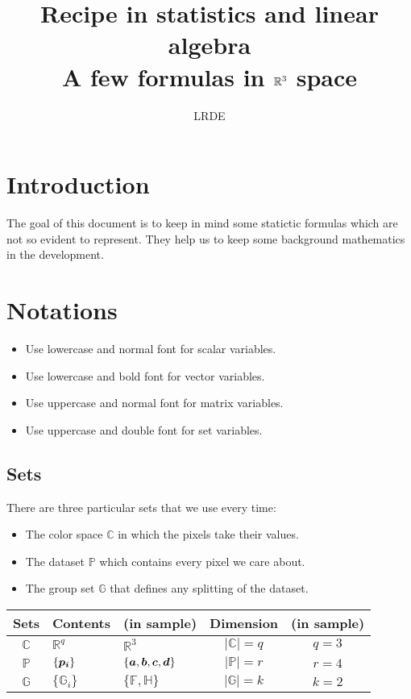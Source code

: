 \documentclass{article}
\title{Recipe in statistics and linear algebra\\
  \large{A few formulas in $\fm{R}^3$ space} }
\author{LRDE}
\date{}
\newcommand{\bm}[1]{\mbox{\boldmath$#1$}}
\newcommand{\fm}[1]{\mathbb{#1}}
\newcommand{\df}[1]{|{\mathbb{#1}}|}
\begin{document}
\maketitle

\section{Introduction}
The goal of this document is to keep in mind some statictic formulas which are
not so evident to represent. They help us to keep some background mathematics
in the development.

\section{Notations}

\begin{itemize}
  \item Use lowercase and normal font for scalar variables.
  \item Use lowercase and bold font for vector variables.
  \item Use uppercase and normal font for matrix variables.
  \item Use uppercase and double font for set variables.
\end {itemize}

\subsection{Sets}

There are three particular sets that we use every time:
\begin{itemize}
  \item The color space $\fm{C}$ in which the pixels take their values.
  \item The dataset $\fm{P}$ which contains every pixel we care about.
  \item The group set $\fm{G}$ that defines any splitting of the dataset.
\end{itemize}

\begin{tabular}{|c|l|l|c|c|}
  \hline
  Sets      & Contents          & (in sample) &
  Dimension & (in sample)  \\
  \hline
  $\fm{C}$     & $\fm{R}^q$     & $\fm{R}^3$  &
  $\df{C} = q$ & $q = 3$ \\
  $\fm{P}$     & $\{\bm{p_i}\}$ &$\{\bm{a},\bm{b},\bm{c},\bm{d}\}$ & 
  $\df{P} = r$ & $r = 4$ \\
  $\fm{G}$     & $\{\fm{G}_i\}$ &$\{\fm{F}, \fm{H}\}$ &
  $\df{G} = k$ & $k = 2$ \\
  \hline
\end{tabular}
\end{document}
